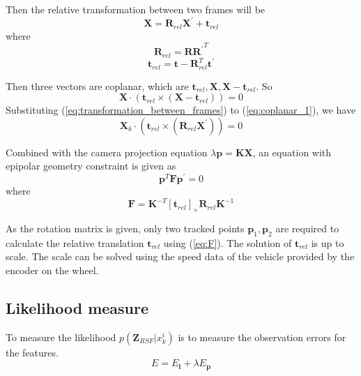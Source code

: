 \documentclass[letterpaper, 10 pt, conference]{ieeeconf}  %
\begin{document}
Then the relative transformation between two frames will be
\begin{equation}
\mathbf{X}=\mathbf{R}_{rel} \mathbf{X}^\prime + \mathbf{t}_{rel}
\label{eq:transformation_between_frames}
\end{equation}
where
\begin{equation}
\mathbf{R}_{rel} = \mathbf{R} {\mathbf{R}^\prime}^T
\end{equation}
\begin{equation}
\mathbf{t}_{rel}=\mathbf{t} - \mathbf{R}_{rel}^T \mathbf{t}^\prime
\end{equation}

Then three vectors are coplanar, which are $\mathbf{t}_{rel},\mathbf{X},\mathbf{X}-\mathbf{t}_{rel}$. So
\begin{equation}
  \mathbf{X}\cdot\left(\mathbf{t}_{rel}\times\left(\mathbf{X}-\mathbf{t}_{rel}\right)\right)=0
  \label{eq:coplanar_1}
\end{equation}
Substituting (\ref{eq:transformation_between_frames}) to (\ref{eq:coplanar_1}), we have
\begin{equation}
  \mathbf{X}_k\cdot\left(\mathbf{t}_{rel}\times\left(\mathbf{R}_{rel}\mathbf{X}^\prime\right)\right)=0
\end{equation}

Combined with the camera projection equation $\lambda \mathbf{p}=\mathbf{K}\mathbf{X}$, an equation with epipolar geometry constraint is given as
\begin{equation}
\mathbf{p}^T \mathbf{F} \mathbf{p}^\prime=0
\end{equation}
where
\begin{equation}
\mathbf{F} = \mathbf{K}^{-T} {\left[\mathbf{t}_{rel}\right]}_\times \mathbf{R}_{rel} \mathbf{K}^{-1}
\label{eq:F}
\end{equation}

As the rotation matrix is given, only two tracked points $\mathbf{p}_1,\mathbf{p}_2$ are required to calculate the relative translation $\mathbf{t}_{rel}$ using (\ref{eq:F}). The solution of $\mathbf{t}_{rel}$ is up to scale. The scale can be solved using the speed data of the vehicle provided by the encoder on the wheel.

\subsection{Likelihood measure}
To measure the likelihood $p(\mathbf{Z}_{RSF} | x_k^i)$ is to measure the observation errors for the features.
\begin{equation}
E= E_\mathbf{l} + \lambda E_\mathbf{p}
\end{equation}
\end{document}
